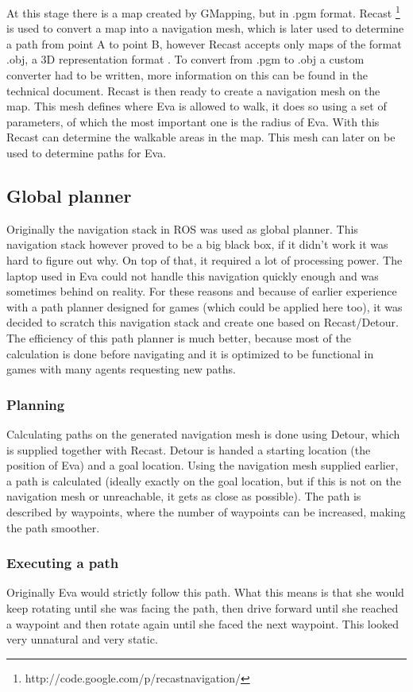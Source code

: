\documentclass[project_eva.tex]{subfiles}
\begin{document}
At this stage there is a map created by GMapping, but in .pgm format. Recast \footnote{http://code.google.com/p/recastnavigation/} is used to convert a map into a navigation mesh, which is later used to determine a path from point A to point B, however Recast accepts only maps of the format .obj, a 3D representation format \cite{wavefront} . To convert from .pgm to .obj a custom converter had to be written, more information on this can be found in the technical document. Recast is then ready to create a navigation mesh on the map. This mesh defines where Eva is allowed to walk, it does so using a set of parameters, of which the most important one is the radius of Eva. With this Recast can determine the walkable areas in the map. This mesh can later on be used to determine paths for Eva.

\subsection*{Global planner}
Originally the navigation stack in ROS was used as global planner. This navigation stack however proved to be a big black box, if it didn't work it was hard to figure out why. On top of that, it required a lot of processing power. The laptop used in Eva could not handle this navigation quickly enough and was sometimes behind on reality. For these reasons and because of earlier experience with a path planner designed for games (which could be applied here too), it was decided to scratch this navigation stack and create one based on Recast/Detour. The efficiency of this path planner is much better, because most of the calculation is done before navigating and it is optimized to be functional in games with many agents requesting new paths.

\subsubsection*{Planning}
Calculating paths on the generated navigation mesh is done using Detour, which is supplied together with Recast. Detour is handed a starting location (the position of Eva) and a goal location. Using the navigation mesh supplied earlier, a path is calculated (ideally exactly on the goal location, but if this is not on the navigation mesh or unreachable, it gets as close as possible). The path is described by waypoints, where the number of waypoints can be increased, making the path smoother.

\subsubsection*{Executing a path}
Originally Eva would strictly follow this path. What this means is that she would keep rotating until she was facing the path, then drive forward until she reached a waypoint and then rotate again until she faced the next waypoint. This looked very unnatural and very static. 
\end{document}

